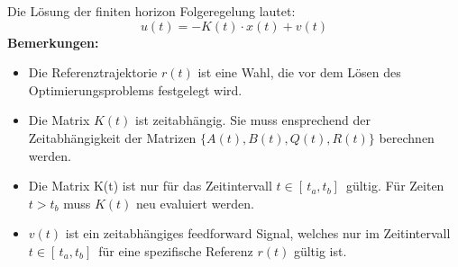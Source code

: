 Die Lösung der finiten horizon Folgeregelung lautet: \[u(t) = -K(t)\cdot x(t) + v(t)\]
\textbf{Bemerkungen:}

\begin{itemize}
    \item Die Referenztrajektorie $r(t)$ ist eine Wahl, die vor dem Lösen des Optimierungsproblems festgelegt wird.
    \item Die Matrix $K(t)$ ist zeitabhängig. Sie muss ensprechend der Zeitabhängigkeit der Matrizen $\{A(t),B(t),Q(t),R(t)\}$ berechnen werden. 
    \item Die Matrix K(t) ist nur für das Zeitintervall $t \in [\,t_a,t_b]\,$ gültig. Für Zeiten $t>t_b$ muss $K(t)$ neu evaluiert werden.
    \item $v(t)$ ist ein zeitabhängiges feedforward Signal, welches nur im Zeitintervall $t \in [\,t_a,t_b]\,$ für eine spezifische Referenz $r(t)$ gültig ist.
\end{itemize}